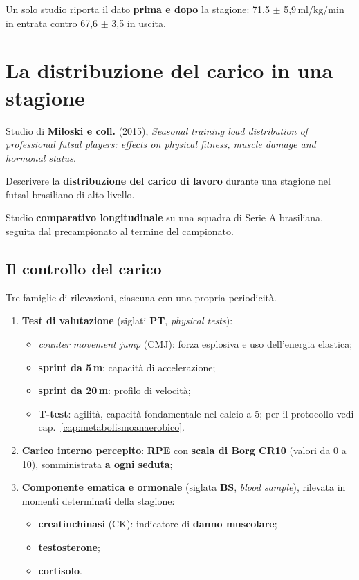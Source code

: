 Un solo studio riporta il dato \textbf{prima e dopo} la stagione: 71,5 $\pm$ 5,9\,ml/kg/min in
entrata contro 67,6 $\pm$ 3,5 in uscita.

\section{La distribuzione del carico in una stagione}

Studio di \textbf{Miloski e coll.} (2015), \textit{Seasonal training load distribution of
professional futsal players: effects on physical fitness, muscle damage and hormonal status}.

Descrivere la \textbf{distribuzione del carico di lavoro} durante una stagione nel futsal
brasiliano di alto livello.

Studio \textbf{comparativo longitudinale} su una squadra di Serie A brasiliana, seguita dal
precampionato al termine del campionato.

\subsection{Il controllo del carico}

Tre famiglie di rilevazioni, ciascuna con una propria periodicità.

\begin{enumerate}
  \item \textbf{Test di valutazione} (siglati \textbf{PT}, \textit{physical tests}):
    \begin{itemize}
      \item \textit{counter movement jump} (CMJ): forza esplosiva e uso dell'energia elastica;
      \item \textbf{sprint da 5\,m}: capacità di accelerazione;
      \item \textbf{sprint da 20\,m}: profilo di velocità;
      \item \textbf{T-test}: agilità, capacità fondamentale nel calcio a 5; per il protocollo
        vedi cap.~\ref{cap:metabolismoanaerobico}.
    \end{itemize}
  \item \textbf{Carico interno percepito}: \textbf{RPE} con \textbf{scala di Borg CR10}
    (valori da 0 a 10), somministrata \textbf{a ogni seduta};
  \item \textbf{Componente ematica e ormonale} (siglata \textbf{BS}, \textit{blood sample}),
    rilevata in momenti determinati della stagione:
    \begin{itemize}
      \item \textbf{creatinchinasi} (CK): indicatore di \textbf{danno muscolare};
      \item \textbf{testosterone};
      \item \textbf{cortisolo}.
    \end{itemize}
\end{enumerate}

